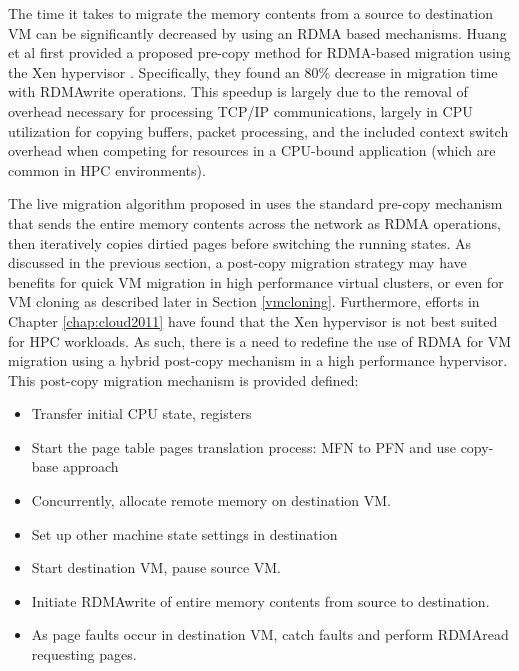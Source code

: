 The time it takes to migrate the memory contents from a source to destination VM can be significantly decreased by using an RDMA based mechanisms. Huang et al first provided a proposed pre-copy method for RDMA-based migration using the Xen hypervisor \cite{huang2007high}. Specifically, they found an 80\% decrease in migration time with RDMAwrite operations. This speedup is largely due to the removal of overhead necessary for processing TCP/IP communications, largely in CPU utilization for copying buffers, packet processing, and the included context switch overhead when competing for resources in a CPU-bound application (which are common in HPC environments). 

The live migration algorithm proposed in \cite{huang2007high} uses the standard pre-copy mechanism that sends the entire memory contents across the network as RDMA operations, then iteratively copies dirtied pages before switching the running states.  As discussed in the previous section, a post-copy migration strategy may have benefits for quick VM migration in high performance virtual clusters, or even for VM cloning as described later in Section \ref{vmcloning}. Furthermore, efforts in Chapter \ref{chap:cloud2011} have found that the Xen hypervisor is not best suited for HPC workloads.  As such, there is a need to redefine the use of RDMA for VM migration using a hybrid post-copy mechanism in a high performance hypervisor. This post-copy migration mechanism is provided defined:

\begin{itemize}
\item Transfer initial CPU state, registers
\item Start the page table pages translation process: MFN to PFN and use copy-base approach
\item Concurrently, allocate remote memory on destination VM.
\item Set up other machine state settings in destination
\item Start destination VM, pause source VM.
\item Initiate RDMAwrite of entire memory contents from source to destination.
\item As page faults occur in destination VM, catch faults and perform RDMAread requesting pages. 
\end{itemize}

